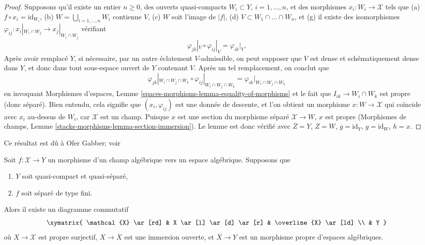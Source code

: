 \begin{proof}
\medskip\noindent
Supposons qu'il existe un entier $n \geq 0$, des ouverts quasi-compacts
$W_i \subset Y$, $i = 1, \ldots, n$, et des
morphismes $x_i : W_i \to \mathcal{X}$ tels que
(a) $f \circ x_i = \text{id}_{W_i}$,
(b) $W = \bigcup_{i = 1, \ldots, n} W_i$ contienne $V$,
(c) $W$ soit l'image de $|f|$,
(d) $V \subset W_1 \cap \ldots \cap W_n$, et
(g) il existe des isomorphismes
$\varphi_{ij} : x_i|_{W_i \cap W_j} \to x_j|_{W_i \cap W_j}$
vérifiant
$$
\varphi_{jk}|_V \circ \varphi_{ij}|_V = \varphi_{ik}|_V.
$$
Après avoir remplacé $Y$, si nécessaire, par un autre éclatement $V$-admissible,
on peut supposer que $V$ est dense et schématiquement dense
dans $Y$, et donc dans tout sous-espace ouvert de $Y$ contenant $V$.
Après un tel remplacement, on conclut que
$$
\varphi_{jk}|_{W_i \cap W_j \cap W_k} \circ
\varphi_{ij}|_{W_i \cap W_j \cap W_k} =
\varphi_{ik}|_{W_i \cap W_j \cap W_k}
$$
en invoquant Morphismes d'espaces, Lemme
\ref{spaces-morphisms-lemma-equality-of-morphisms}
et le fait que $I_{ik} \to W_i \cap W_k$ est propre
(donc séparé).
Bien entendu, cela signifie que $(x_i, \varphi_{ij})$
est une donnée de descente, et l'on obtient un morphisme
$x : W \to \mathcal{X}$ qui coïncide avec $x_i$ au-dessus de $W_i$,
car $\mathcal{X}$ est un champ.
Puisque $x$ est une section du morphisme séparé
$\mathcal{X} \to W$, $x$ est propre
(Morphismes de champs, Lemme \ref{stacks-morphisms-lemma-section-immersion}).
Le lemme est donc vérifié avec $\overline{Z} = Y$,
$Z = W$, $\overline{g} = \text{id}_Y$, $g = \text{id}_W$,
$h = x$.
\end{proof}

\begin{theorem}
\label{theorem-chow-finite-type}
\begin{reference}
Ce résultat est dû à Ofer Gabber; voir
\cite[Theorem 1.1]{olsson_proper}
\end{reference}
Soit $f : \mathcal{X} \to Y$ un morphisme d'un champ algébrique
vers un espace algébrique. Supposons que
\begin{enumerate}
\item $Y$ soit quasi-compact et quasi-séparé,
\item $f$ soit séparé de type fini.
\end{enumerate}
Alors il existe un diagramme commutatif
$$
\xymatrix{
\mathcal{X} \ar[rd] & X \ar[l] \ar[d] \ar[r] & \overline{X} \ar[ld] \\
& Y
}
$$
où $X \to \mathcal{X}$ est propre surjectif,
$X \to \overline{X}$ est une immersion ouverte, et
$\overline{X} \to Y$ est un morphisme propre d'espaces algébriques.
\end{theorem}

